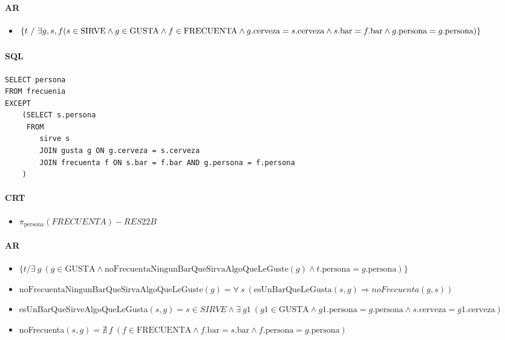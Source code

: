 \paragraph{AR}
\begin{itemize}
\item[] $\{t~/~\exists g,s,f (s\in\text{SIRVE} \land g\in\text{GUSTA} \land f\in\text{FRECUENTA} \\ \land g.\text{cerveza} = s.\text{cerveza} \land s.\text{bar} = f.\text{bar} \land  g.\text{persona} = g.\text{persona})\}$
\end{itemize}
\subsubsection{}
\paragraph{SQL}
\begin{verbatim}
SELECT persona
FROM frecuenia
EXCEPT 
	(SELECT s.persona
	 FROM 
		sirve s
		JOIN gusta g ON g.cerveza = s.cerveza
		JOIN frecuenta f ON s.bar = f.bar AND g.persona = f.persona
	)
\end{verbatim}


\paragraph{CRT}
\begin{itemize}
\item[] $\pi_{\text{persona}}(FRECUENTA) - RES22B$
\end{itemize}

\paragraph{AR}
\begin{itemize}
	\item[] $\{ t / \exists~ g~ (g\in\text{GUSTA} \land \text{noFrecuentaNingunBarQueSirvaAlgoQueLeGuste}(g) \land t.\text{persona} = g.\text{persona})\} $
	
	\item[] $\text{noFrecuentaNingunBarQueSirvaAlgoQueLeGuste}(g) = \forall~ s~(\text{esUnBarQueLeGusta}(s,g) \Rightarrow noFrecuenta(g,s))$
	
	\item[] esUnBarQueSirveAlgoQueLeGusta$(s,g) = s\in SIRVE \land \exists~g1~(g1\in\text{GUSTA} \land g1.\text{persona} = g.\text{persona} \land s.\text{cerveza} = g1.\text{cerveza})$
	
	\item[] noFrecuenta$(s,g) = \nexists~f~(f\in\text{FRECUENTA} \land f.\text{bar} = s.\text{bar}\land f.\text{persona} = g.\text{persona})$
\end{itemize}

